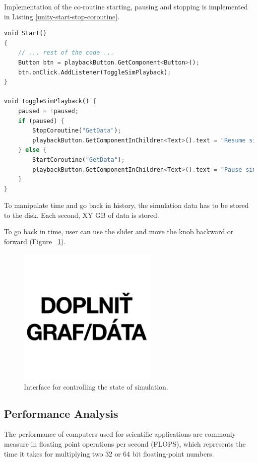 Implementation of the co-routine starting, pausing and stopping is implemented in Listing \ref{unity-start-stop-coroutine}.

\begin{lstlisting}[language=Rust, caption="Starting\, pausing and stopping the co-routines in Unity.", label=unity-start-stop-coroutine]
void Start()
{
	// ... rest of the code ...
	Button btn = playbackButton.GetComponent<Button>();
	btn.onClick.AddListener(ToggleSimPlayback);
}

void ToggleSimPlayback() {
	paused = !paused;
	if (paused) {
		StopCoroutine("GetData");
		playbackButton.GetComponentInChildren<Text>().text = "Resume simulation";
	} else {
		StartCoroutine("GetData");
		playbackButton.GetComponentInChildren<Text>().text = "Pause simulation";
	}
}
\end{lstlisting}

To manipulate time and go back in history, the simulation data has to be stored to the disk. Each second, XY GB of data is stored. 

To go back in time, user can use the slider and move the knob backward or forward (Figure~ \ref{fig:unity-time-manipulation}).

\begin{figure}[!ht]
	\centering
	\includegraphics[width=0.6\textwidth]{figures/empty.jpg}
	\caption{Interface for controlling the state of simulation.}
	\label{fig:unity-time-manipulation}
\end{figure}


\subsection{Performance Analysis}\label{perf-analysis}
The performance of computers used for scientific applications are commonly measure in floating point operations per second (FLOPS), which represents the time it takes for multiplying two 32 or 64 bit floating-point numbers.


